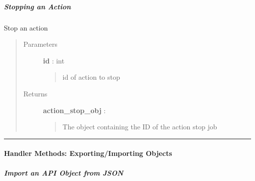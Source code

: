 \documentclass[letterpaper,10pt,english]{sphinxmanual}
\begin{document}
\subparagraph{Stopping an Action}
\label{pytan.handler:stopping-an-action}

\begin{fulllineitems}
\label{pytan.handler:pytan.handler.Handler.stop_action}
Stop an action
\begin{quote}\begin{description}
\item[{Parameters}] \leavevmode
\textbf{id} : int
\begin{quote}

id of action to stop
\end{quote}

\item[{Returns}] \leavevmode
\textbf{action\_stop\_obj} : {\hyperref[taniumpy.object_types:taniumpy.object_types.action_stop.ActionStop]{}}
\begin{quote}

The object containing the ID of the action stop job
\end{quote}

\end{description}\end{quote}

\end{fulllineitems}



\bigskip\hrule{}\bigskip



\paragraph{Handler Methods: Exporting/Importing Objects}
\label{pytan.handler:handler-methods-exporting-importing-objects}

\subparagraph{Import an API Object from JSON}
\label{pytan.handler:import-an-api-object-from-json}
\end{document}
